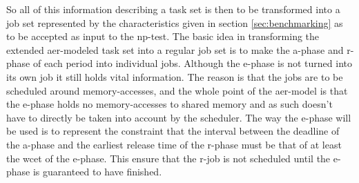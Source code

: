 \documentclass{kththesis}
\begin{document}
So all of this information describing a task set is then to be transformed into a job set represented by
the characteristics given in section \ref{sec:benchmarking} as to be accepted as input to the
\acrshort{np}-test. The basic idea in transforming the extended \acrshort{aer}-modeled task set into a
regular job set is to make the \acrshort{a}-phase and \acrshort{r}-phase of each period into
individual jobs. Although the \acrshort{e}-phase is not turned into its own job it still holds vital
information. The reason is that the jobs are to be scheduled around memory-accesses, and the whole
point of the \acrshort{aer}-model is that the \acrshort{e}-phase holds no memory-accesses to shared
memory and as such doesn't have to directly be taken into account by the scheduler. The way the
\acrshort{e}-phase will be used is to represent the constraint that the interval between the deadline
of the \acrshort{a}-phase and the earliest release time of the \acrshort{r}-phase must be that of at
least the \acrshort{wcet} of the \acrshort{e}-phase. This ensure that the \acrshort{r}-job is not
scheduled until the \acrshort{e}-phase is guaranteed to have finished. 
\end{document}
